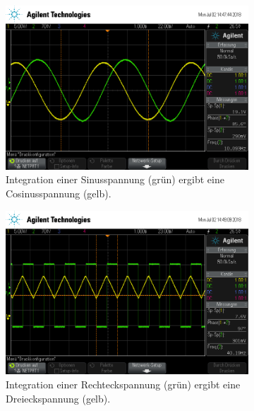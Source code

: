 \begin{figure}[ht]
  \centering
  \begin{subfigure}[]{\textwidth}
    \centering
    \includegraphics[height=0.28\textheight]{data/scope_262.png}
    \caption{Integration einer Sinusspannung (grün) ergibt eine Cosinusspannung (gelb).}
    \label{subfig:int_sinus}
  \end{subfigure}
  \begin{subfigure}[]{\textwidth}
    \centering
    \includegraphics[height=0.28\textheight]{data/scope_263.png}
    \caption{Integration einer Rechteckspannung (grün) ergibt eine Dreieckspannung (gelb).}
    \label{subfig:int_rechteck}
  \end{subfigure}
  \begin{subfigure}[]{\textwidth}
    \centering

\end{subfigure}
\end{figure}
